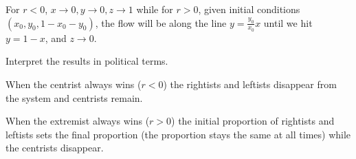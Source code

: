 \documentclass[12pt,letterpaper]{exam}
\begin{document}
\begin{questions}
\begin{parts}
\begin{solution}
\begin{itemize}
For $r<0$, $x\rightarrow 0, y\rightarrow 0, z\rightarrow 1$ while for $r> 0$, given initial conditions $(x_0, y_0, 1-x_0-y_0)$, the flow will be along the line $y = \frac{y_0}{x_0} x$ until we hit $y = 1- x$, and $z \rightarrow 0$.

\end{itemize}

\end{solution}
\item Interpret the results in political terms.
\begin{solution}
When the centrist always wins ($r < 0 $) the rightists and leftists disappear from the system and centrists remain.

When the extremist always wins ($r>0$) the initial proportion of rightists and leftists sets the final proportion (the proportion stays the same at all times) while the centrists disappear.
\end{solution}

\end{parts}


 \end{questions}
\end{document}
